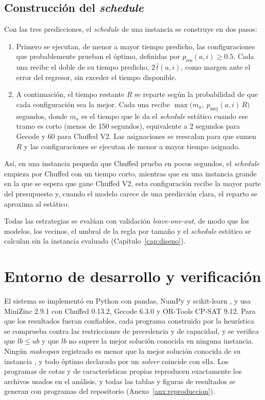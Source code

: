 \subsection{Construcción del \textit{schedule}}
Con las tres predicciones, el \textit{schedule} de una instancia se construye
en dos pasos:

\begin{enumerate}
  \item Primero se ejecutan, de menor a mayor tiempo predicho, las
    configuraciones que probablemente prueban el óptimo, definidas por
    $p_{\mathrm{res}}(a, i) \ge 0.5$. Cada una recibe el doble de su tiempo
    predicho, $2\,\hat{t}(a, i)$, como margen ante el error del regresor, sin
    exceder el tiempo disponible.
  \item A continuación, el tiempo restante $R$ se reparte según la probabilidad
    de que cada configuración sea la mejor. Cada una recibe
    $\max\bigl(m_a,\ p_{\mathrm{mej}}(a, i)\,R\bigr)$ segundos, donde $m_a$ es
    el tiempo que le da el \textit{schedule} estático cuando ese tramo es corto
    (menos de 150 segundos), equivalente a 2 segundos para Gecode y 60 para
    Chuffed V2. Las asignaciones se reescalan para que sumen $R$ y las
    configuraciones se ejecutan de menor a mayor tiempo asignado.
\end{enumerate}

\noindent Así, en una instancia pequeña que Chuffed prueba en pocos segundos,
el \textit{schedule} empieza por Chuffed con un tiempo corto, mientras que en
una instancia grande en la que se espera que gane Chuffed V2, esta
configuración recibe la mayor parte del presupuesto y, cuando el modelo carece
de una predicción clara, el reparto se aproxima al estático.

Todas las estrategias se evalúan con validación \textit{leave-one-out}, de modo
que los modelos, los vecinos, el umbral de la regla por tamaño y el
\textit{schedule} estático se calculan sin la instancia evaluada
(Capítulo~\ref{cap:diseno}).

\section{Entorno de desarrollo y verificación}
\label{sec:entorno}

El sistema se implementó en Python con pandas, NumPy y scikit-learn
\citep{pedregosa2011}, y usa MiniZinc 2.9.1 con Chuffed 0.13.2, Gecode 6.3.0
y OR-Tools CP-SAT 9.12. Para que los resultados fueran confiables, cada
programa construido por la heurística se comprueba contra las restricciones de
precedencia y de capacidad, y se verifica que $lb \le ub$ y que $lb$ no supere
la mejor solución conocida en ninguna instancia. Ningún \textit{makespan}
registrado es menor que la mejor solución conocida de su instancia
\citep{weise2019jssp}, y todo óptimo declarado por un \textit{solver} coincide
con ella. Los programas de cotas y de características propias reproducen
exactamente los archivos usados en el análisis, y todas las tablas y figuras
de resultados se generan con programas del repositorio
(Anexo~\ref{anx:reproduccion}).
